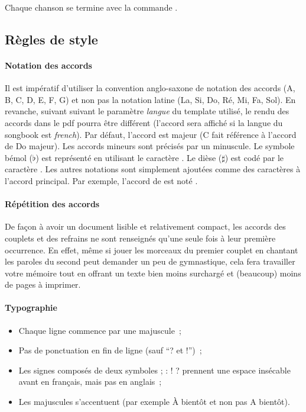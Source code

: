 Chaque chanson se termine avec la commande .

\subsection{Règles de style}

\paragraph{Notation des accords}
Il est impératif d'utiliser la convention anglo-saxone de notation des
accords (A, B, C, D, E, F, G) et non pas la notation latine (La, Si,
Do, Ré, Mi, Fa, Sol). En revanche, suivant suivant le paramètre
\emph{langue} du template utilisé, le rendu des accords dans le pdf
pourra être différent (l'accord \latexcom{[D]} sera affiché
 si la langue du songbook est \emph{french}). Par défaut,
l'accord est majeur (C fait référence à l'accord de Do majeur). Les
accords mineurs sont précisés par un  minuscule.  Le
symbole bémol ($\flat$) est représenté en utilisant le caractère
\command{\&}. Le dièse ($\sharp$) est codé par le caractère
\command{\#}. Les autres notations sont simplement ajoutées comme des
caractères à l'accord principal. Par exemple, l'accord de  est noté \latexcom{[A\&m]}.

\paragraph{Répétition des accords}
De façon à avoir un document lisible et relativement compact, les
accords des couplets et des refrains ne sont renseignés qu'une seule
fois à leur première occurrence. En effet, même si jouer les morceaux
du premier couplet en chantant les paroles du second peut demander un
peu de gymnastique, cela fera travailler votre mémoire tout en offrant
un texte bien moins surchargé et (beaucoup) moins de pages à imprimer.

\paragraph{Typographie}
\begin{itemize}
  \item Chaque ligne commence par une majuscule~;
  \item Pas de ponctuation en fin de ligne (sauf ``? et !'')~;
  \item Les signes composés de deux symboles {\og}; : ! ?{\fg}
    prennent une espace insécable avant en français, mais pas en
    anglais~;
  \item Les majuscules s'accentuent (par exemple {\og}À bientôt{\fg}
    et non pas {\og}A bientôt{\fg}).
\end{itemize}

